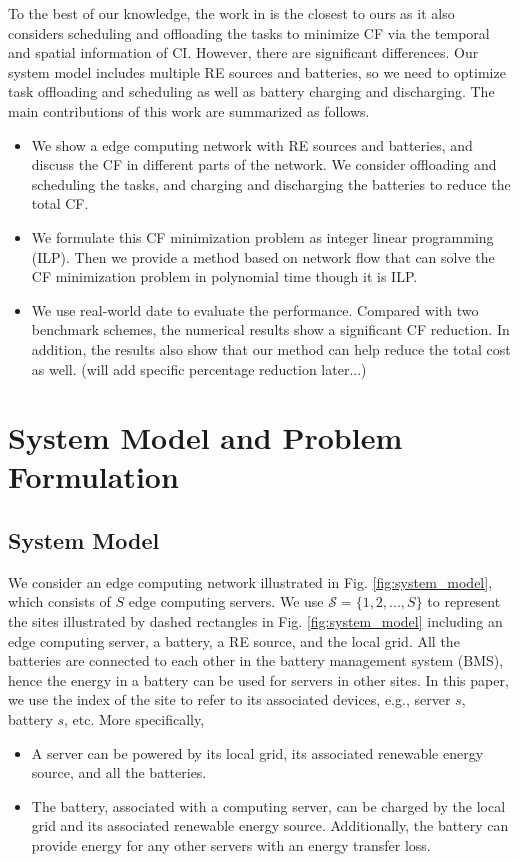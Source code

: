 \documentclass[conference, 10pt, ﬁnal, letterpaper, twocolumn]{IEEEtran}
\begin{document}
To the best of our knowledge, the work in \cite{yang2022carbon} is the closest to ours as it also considers scheduling and offloading the tasks to minimize CF via the temporal and spatial information of CI. However, there are significant differences. Our system model includes multiple RE sources and batteries, so we need to optimize task offloading and scheduling as well as battery charging and discharging. The main contributions of this work are summarized as follows.
\begin{itemize}
    \item We show a edge computing network with RE sources and batteries, and discuss the CF in different parts of the network. We consider offloading and scheduling the tasks, and charging and discharging the batteries to reduce the total CF. 
    \item We formulate this CF minimization problem as integer linear programming (ILP). Then we provide a method based on network flow that can solve the CF minimization problem in polynomial time though it is ILP.
    \item We use real-world date to evaluate the performance. Compared with two benchmark schemes, the numerical results show a significant CF reduction. In addition, the results also show that our method can help reduce the total cost as well. {\color{red}(will add specific percentage reduction later...)}
\end{itemize}

\section{System Model and Problem Formulation}



\subsection{System Model}
We consider an edge computing network illustrated in Fig. \ref{fig:system_model}, which consists of $S$ edge computing servers. We use $\mathcal{S} = \{1,2,...,S\}$ to represent the sites illustrated by dashed rectangles in Fig. \ref{fig:system_model} including an edge computing server, a battery, a RE source, and the local grid. All the batteries are connected to each other in the battery management system (BMS), hence the energy in a battery can be used for servers in other sites. In this paper, we use the index of the site to refer to its associated devices, e.g., server $s$, battery $s$, etc. More specifically,
\begin{itemize}
    \item A server can be powered by its local grid, its associated renewable energy source, and all the batteries. 
    \item The battery, associated with a computing server, can be charged by the local grid and its associated renewable energy source. Additionally, the battery can provide energy for any other servers with an energy transfer loss.
\end{itemize}
\end{document}
